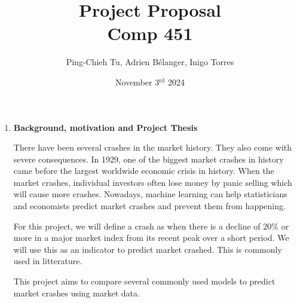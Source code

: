 \documentclass[12pt, letterpaper]{article}
\title{
  Project Proposal \\
  \Large Comp 451}
\author{Ping-Chieh Tu, Adrien Bélanger, Inigo Torres}
\date{November 3$^{\text{rd}}$ 2024}
\begin{document}
\maketitle 

\begin{enumerate}[label=]
    \item \textbf{Background, motivation and Project Thesis}

    There have been several crashes in the market history. They also come with severe consequences. In 1929, one of the biggest market crashes in history came before the largest worldwide economic crisis in history. When the market crashes, individual investors often lose money by panic selling which will cause more crashes. Nowadays, machine learning can help statisticians and economists predict market crashes and prevent them from happening.

    For this project, we will define a crash as when there is a decline of 20$\%$ or more in a major market index from its recent peak over a short period. We will use this as an indicator to predict market crashed. This is commonly used in litterature.
    
   


    This project aims to compare several commonly used models to predict market crashes using market data.
    

\end{enumerate}
\end{document}
